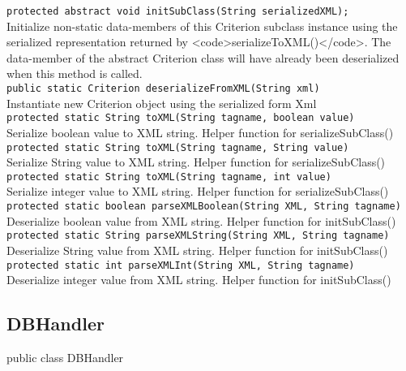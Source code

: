 {\tt 	protected abstract void initSubClass(String serializedXML);} \\
Initialize non-static data-members of this Criterion subclass instance using the 
serialized representation returned by <code>serializeToXML()</code>. The data-member
of the abstract Criterion class will have already been deserialized when this method
is called. \\
	
{\tt 	public static Criterion deserializeFromXML(String xml)} \\
Instantiate new Criterion object using the serialized form Xml \\
	
{\tt 	protected static String toXML(String tagname, boolean value)} \\
Serialize boolean value to XML string. Helper function for serializeSubClass() \\
	
{\tt 	protected static String toXML(String tagname, String value)} \\
Serialize String value to XML string. Helper function for serializeSubClass() \\
	
{\tt 	protected static String toXML(String tagname, int value)} \\
Serialize integer value to XML string. Helper function for serializeSubClass() \\

{\tt 	protected static boolean parseXMLBoolean(String XML, String tagname)} \\
Deserialize boolean value from XML string. Helper function for initSubClass() \\

{\tt 	protected static String parseXMLString(String XML, String tagname)} \\
Deserialize String value from XML string. Helper function for initSubClass() \\
	
{\tt 	protected static int parseXMLInt(String XML, String tagname)} \\
Deserialize integer value from XML string. Helper function for initSubClass() \\






\subsection{DBHandler}
public class DBHandler

